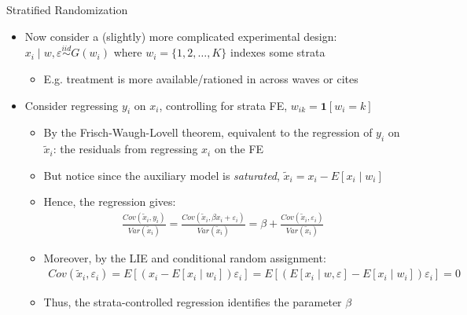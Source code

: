 \documentclass[11pt,english]{beamer}
\begin{document}
\begin{frame}{Stratified Randomization}
\begin{itemize}
\item Now consider a (slightly) more complicated experimental design: $x_i\mid w, \varepsilon \stackrel{iid}{\sim} G(w_i)$ where $w_i=\{1,2,\dots,K\}$ indexes some strata\smallskip\pause{}
\begin{itemize}
\item E.g. treatment is more available/rationed in across waves or cites\pause{}
\end{itemize}\medskip
\item Consider regressing $y_i$ on $x_i$, controlling for strata FE, $w_{ik}=\mathbf{1}[w_i=k]$\smallskip\pause{}
\begin{itemize}
\item By the Frisch-Waugh-Lovell theorem, equivalent to the regression of $y_i$ on $\tilde{x}_i$: the residuals from regressing $x_i$ on the FE\smallskip\pause{}
\item But notice since the auxiliary model is \emph{saturated}, $\tilde{x}_i=x_i-E[x_i\mid w_i]$\smallskip\pause{}
\item Hence, the regression gives:\vspace{-0.1cm}
\begin{align*}
\frac{Cov(\tilde{x}_i,y_i)}{Var(\tilde{x}_i)}=\frac{Cov(\tilde{x}_i,\beta x_i+\varepsilon_i)}{Var(\tilde{x}_i)}=\beta +\frac{Cov(\tilde{x}_i,\varepsilon_i)}{Var(\tilde{x}_i)}
\end{align*}\pause{}
\item Moreover, by the LIE and conditional random assignment:
\begin{align*}
Cov(\tilde{x}_i,\varepsilon_i)=E[(x_i-E[x_i\mid w_i])\varepsilon_i]=E[(E[x_i\mid w,\varepsilon]-E[x_i\mid w_i])\varepsilon_i]=0
\end{align*}\vspace{-0.5cm}\pause{}
\item Thus, the strata-controlled regression identifies the parameter $\beta$
\end{itemize}
\end{itemize}
\end{frame}
\end{document}
